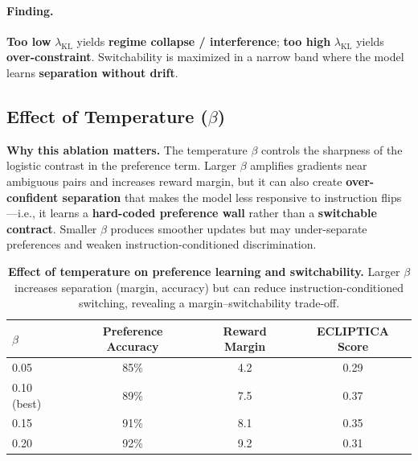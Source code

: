 \vspace{-0.15em}
\paragraph{\textbf{Finding.}}
\textbf{Too low} $\lambda_{\text{KL}}$ yields \textbf{regime collapse / interference}; \textbf{too high} $\lambda_{\text{KL}}$ yields \textbf{over-constraint}.
Switchability is maximized in a narrow band where the model learns \textbf{separation without drift}.

\subsection{Effect of Temperature ($\beta$)}

\vspace{-0.25em}
\noindent
\textbf{Why this ablation matters.}
The temperature $\beta$ controls the sharpness of the logistic contrast in the preference term.
Larger $\beta$ amplifies gradients near ambiguous pairs and increases reward margin, but it can also create \textbf{over-confident separation} that makes the model less responsive to instruction flips---i.e., it learns a \textbf{hard-coded preference wall} rather than a \textbf{switchable contract}.
Smaller $\beta$ produces smoother updates but may under-separate preferences and weaken instruction-conditioned discrimination.

\begin{table}[ht!]
\centering
\small
\renewcommand{\arraystretch}{1.2}
\begin{tabular}{@{}lccc@{}}
\toprule
\textbf{$\beta$} & \textbf{Preference Accuracy} & \textbf{Reward Margin} & \textbf{ECLIPTICA Score} \\
\midrule
0.05 & 85\% & 4.2 & 0.29 \\ \hline
0.10 (best) & 89\% & 7.5 & 0.37 \\ \hline
0.15 & 91\% & 8.1 & 0.35 \\ \hline
0.20 & 92\% & 9.2 & 0.31 \\
\bottomrule
\end{tabular}
\caption{\textbf{Effect of temperature on preference learning and switchability.} Larger $\beta$ increases separation (margin, accuracy) but can reduce instruction-conditioned switching, revealing a margin--switchability trade-off.}
\label{tab:beta_ablation}
\end{table}

